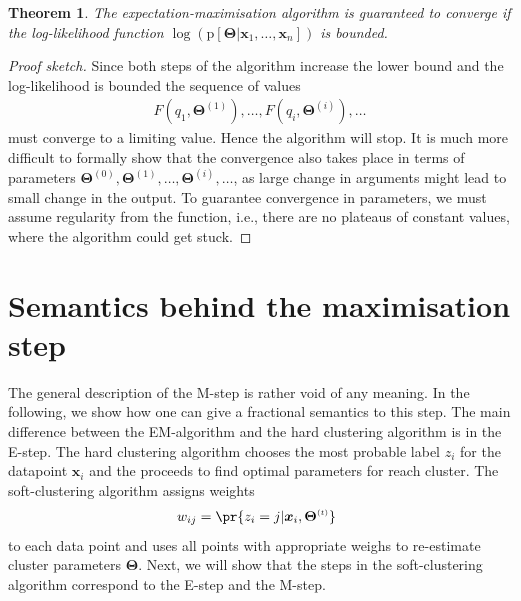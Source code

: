 \documentclass{article}
\newtheorem{theorem}{Theorem}
\renewcommand{\vec}[1]{\boldsymbol{#1}}
\newcommand{\pd}[1]{\mathrm{p}[#1]}
\newcommand{\supi}[1]{^{\scriptscriptstyle(#1)}}
\begin{document}
\begin{theorem}
The expectation-maximisation algorithm is guaranteed to converge if the log-likelihood function $\log(\pd{\vec{\Theta}|\vec{x}_1,\ldots,\vec{x}_n})$ is bounded.
\end{theorem} 
\begin{proof}[Proof sketch]
Since both steps of the algorithm increase the lower bound and the log-likelihood is bounded the sequence of values 
\begin{align*}
F(q_{1},\vec{\Theta}\supi{1}),\ldots,
F(q_{i},\vec{\Theta}\supi{i}),\ldots
\end{align*}
must converge to a limiting value. Hence the algorithm will stop. It is much more difficult to formally show that the convergence also takes place in terms of parameters $\vec{\Theta}\supi{0}, \vec{\Theta}\supi{1},\ldots,\vec{\Theta}\supi{i},\ldots$, as large change in arguments might lead to small change in the output. To guarantee convergence in parameters, we must assume regularity from the function, i.e., there are no plateaus of constant values, where the algorithm could get stuck.    
\end{proof}

\section{Semantics behind the maximisation step}

The general description of the M-step is rather void of any meaning. In the following, we show how one can give a fractional semantics to this step. The main difference between the EM-algorithm and the hard clustering algorithm is in the E-step. The hard clustering algorithm chooses the most probable label $z_i$ for the datapoint $\vec{x}_i$ and the proceeds to find optimal parameters for reach cluster. The soft-clustering algorithm assigns weights  
\begin{align*}
w_{ij}=\pr{z_i=j|\vec{x}_i,\vec{\Theta}\supi{t}}\enspace
\end{align*}
to each data point and uses all points with appropriate weighs to re-estimate cluster parameters $\vec{\Theta}$. Next, we will show that the steps in the soft-clustering algorithm correspond to the E-step and the M-step. 
\end{document}
